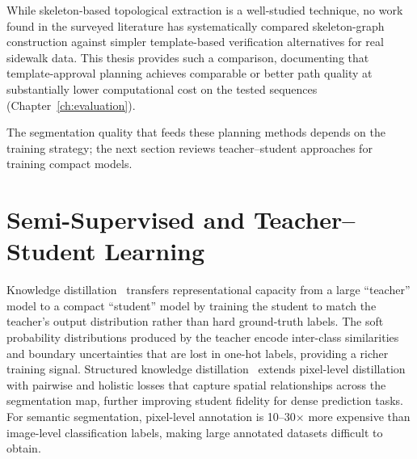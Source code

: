 \documentclass[12pt,letterpaper,oneside]{report}
\begin{document}
While skeleton-based topological extraction is a well-studied technique, no work found in the surveyed literature has systematically compared skeleton-graph construction against simpler template-based verification alternatives for real sidewalk data. This thesis provides such a comparison, documenting that template-approval planning achieves comparable or better path quality at substantially lower computational cost on the tested sequences (Chapter~\ref{ch:evaluation}).

The segmentation quality that feeds these planning methods depends on the training strategy; the next section reviews teacher--student approaches for training compact models.


\section{Semi-Supervised and Teacher--Student Learning}
\label{sec:lit_teacher_student}

Knowledge distillation~\cite{hinton2015distilling} transfers representational capacity from a large ``teacher'' model to a compact ``student'' model by training the student to match the teacher's output distribution rather than hard ground-truth labels. The soft probability distributions produced by the teacher encode inter-class similarities and boundary uncertainties that are lost in one-hot labels, providing a richer training signal. Structured knowledge distillation~\cite{liu2019skd} extends pixel-level distillation with pairwise and holistic losses that capture spatial relationships across the segmentation map, further improving student fidelity for dense prediction tasks. For semantic segmentation, pixel-level annotation is 10--30$\times$ more expensive than image-level classification labels, making large annotated datasets difficult to obtain.
\end{document}
